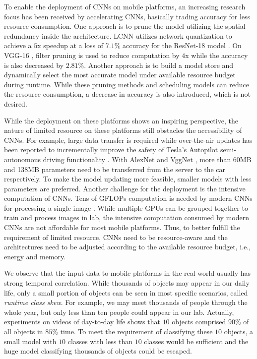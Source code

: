 \documentclass[pageno]{jpaper}
\begin{document}
To enable the deployment of CNNs on mobile platforms, an increasing research focus has been received by accelerating CNNs, basically trading accuracy for less resource consumption. One approach is to prune the model utilizing the spatial redundancy inside the architecture. LCNN \cite{bagherinezhad2017lcnn} utilizes network quantization to achieve a $5$x speedup at a loss of $7.1$\% accuracy for the ResNet-18 model \cite{he2016deep}. On VGG-16 \cite{simonyan2014very}, filter pruning \cite{lin2018accelerating} is used to reduce computation by $4$x while the accuracy is also decreased by $2.81$\%. Another approach is to build a model store and dynamically select the most accurate model under available resource budget during runtime. 
While these pruning methods and scheduling models can reduce the resource consumption, a decrease in accuracy is also introduced, which is not desired.







While the deployment on these platforms shows an inspiring perspective, the nature of limited resource on these platforms still obstacles the accessibility of CNNs. For example, large data transfer is required while over-the-air updates has been reported to incrementally improve the safety of Tesla's Autopilot semi-autonomous driving functionality \cite{teslas2018}. With AlexNet\cite{krizhevsky2012imagenet} and VggNet \cite{simonyan2014very}, more than 60MB and 138MB parameters need to be transferred from the server to the car respectively. To make the model updating more feasible, smaller models with less parameters are preferred. Another challenge for the deployment is the intensive computation of CNNs. Tens of GFLOPs computation is needed by modern CNNs for processing a single image \cite{canziani2016analysis}. While multiple GPUs can be grouped together to train and process images in lab, the intensive computation consumed by modern CNNs are not affordable for most mobile platforms. Thus, to better fulfill the requirement of limited resource, CNNs need to be resource-aware and the architectures need to be adjusted according to the available resource budget, i.e., energy and memory.

We observe that the input data to mobile platforms in the real world usually has strong temporal correlation. While thousands of objects may appear in our daily life, only a small portion of objects can be seen in most specific scenarios, called \textit{runtime class skew}. For example, we may meet thousands of people through the whole year, but only less than ten people could appear in our lab. Actually, experiments on videos of day-to-day life \cite{shen2016fast} shows that $10$ objects comprised $90$\% of all objects in $85$\% time. To meet the requirement of classifying these $10$ objects, a small model with $10$ classes with less than $10$ classes would be sufficient and the huge model classifying thousands of objects could be escaped. 
\end{document}

